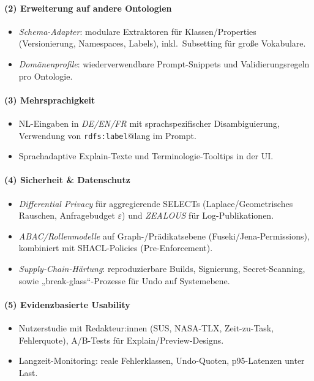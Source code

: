 \paragraph{(2) Erweiterung auf andere Ontologien}
\begin{itemize}
  \item \emph{Schema-Adapter}: modulare Extraktoren für Klassen/Properties (Versionierung, Namespaces, Labels), inkl.\ Subsetting für große Vokabulare.
  \item \emph{Domänenprofile}: wiederverwendbare Prompt-Snippets und Validierungsregeln pro Ontologie.
\end{itemize}

\paragraph{(3) Mehrsprachigkeit}
\begin{itemize}
  \item NL-Eingaben in \emph{DE/EN/FR} mit sprachspezifischer Disambiguierung, Verwendung von \texttt{rdfs:label}@lang im Prompt.
  \item Sprachadaptive Explain-Texte und Terminologie-Tooltips in der UI.
\end{itemize}

\paragraph{(4) Sicherheit \& Datenschutz}
\begin{itemize}
  \item \emph{Differential Privacy} für aggregierende SELECTs (Laplace/Geometrisches Rauschen, Anfragebudget $\varepsilon$) und \emph{ZEALOUS} für Log-Publikationen.
  \item \emph{ABAC/Rollenmodelle} auf Graph-/Prädikatsebene (Fuseki/Jena-Permissions), kombiniert mit SHACL-Policies (Pre-Enforcement).
  \item \emph{Supply-Chain-Härtung}: reproduzierbare Builds, Signierung, Secret-Scanning, sowie „break-glass“-Prozesse für Undo auf Systemebene.
\end{itemize}

\paragraph{(5) Evidenzbasierte Usability}
\begin{itemize}
  \item Nutzerstudie mit Redakteur:innen (SUS, NASA-TLX, Zeit-zu-Task, Fehlerquote), A/B-Tests für Explain/Preview-Designs.
  \item Langzeit-Monitoring: reale Fehlerklassen, Undo-Quoten, p95-Latenzen unter Last.
\end{itemize}

